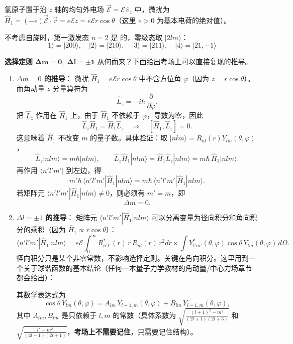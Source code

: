 \begin{modelbox}
氢原子置于沿 $z$ 轴的均匀外电场 $\vec{\mathcal{E}} = \mathcal{E}\,\hat{e}_z$ 中，微扰为 $\hat{H}_1 = (-e)\vec{\mathcal{E}}\cdot\vec{r} = e\mathcal{E} z = e\mathcal{E} r \cos\theta$（这里 $e>0$ 为基本电荷的绝对值）。

不考虑自旋时，第一激发态 $n=2$ 是 的，零级态取 $|2lm\rangle$：
\[
|1\rangle = |200\rangle, \quad |2\rangle = |210\rangle, \quad |3\rangle = |211\rangle, \quad |4\rangle = |21,-1\rangle
\]

\textbf{选择定则} $\mathbf{\Delta m = 0,\; \Delta l = \pm 1}$ 从何而来？下面给出考场上可以直接复现的推导。

\begin{enumerate}[nosep]
    \item \textbf{$\Delta m = 0$ 的推导}：
    微扰 $\hat{H}_1 = e\mathcal{E} r \cos\theta$ 中不含方位角 $\varphi$（因为 $z = r\cos\theta$）。而角动量 $z$ 分量算符为
    \[
    \hat{L}_z = -i\hbar \, \frac{\partial}{\partial\varphi}.
    \]
    把 $\hat{L}_z$ 作用在 $\hat{H}_1$ 上，由于 $\hat{H}_1$ 不依赖于 $\varphi$，导数为零，因此
    \[
    \hat{L}_z \hat{H}_1 = \hat{H}_1 \hat{L}_z \quad\Longrightarrow\quad [\hat{H}_1, \hat{L}_z] = 0.
    \]
    这意味着 $\hat{H}_1$ 不改变 $m$ 的量子数。具体验证：取 $|nlm\rangle = R_{nl}(r) Y_{lm}(\theta,\varphi)$，
    \[
    \hat{L}_z |nlm\rangle = m\hbar |nlm\rangle, \qquad \hat{L}_z \hat{H}_1 |nlm\rangle = \hat{H}_1 \hat{L}_z |nlm\rangle = m\hbar \, \hat{H}_1 |nlm\rangle.
    \]
    再作用 $\langle n'l'm'|$ 到左边，得
    \[
    m' \hbar \, \langle n'l'm'|\hat{H}_1|nlm\rangle = m \hbar \, \langle n'l'm'|\hat{H}_1|nlm\rangle.
    \]
    若矩阵元 $\langle n'l'm'|\hat{H}_1|nlm\rangle \neq 0$，则必须有 $m' = m$，即
    \[
    \boxed{\Delta m = 0}.
    \]

    \item \textbf{$\Delta l = \pm 1$ 的推导}：
    矩阵元 $\langle n'l'm'|\hat{H}_1|nlm\rangle$ 可以分离变量为径向积分和角向积分的乘积（因为 $\hat{H}_1 \propto r\cos\theta$）：
    \[
    \langle n'l'm'|\hat{H}_1|nlm\rangle = e\mathcal{E} \int_0^\infty R_{n'l'}^*(r) \, r \, R_{nl}(r) \, r^2 dr \times \int Y_{l'm'}^*(\theta,\varphi) \cos\theta \, Y_{lm}(\theta,\varphi) \, d\Omega.
    \]
    径向积分只是某个非零常数，不影响选择定则。关键在角向积分。这里用到一个关于球谐函数的基本结论（任何一本量子力学教材的角动量/中心力场章节都会给出）：
    \begin{center}
    \end{center}
    其数学表达式为
    \[
    \cos\theta \, Y_{lm}(\theta,\varphi) = A_{lm} \, Y_{l+1,m}(\theta,\varphi) + B_{lm} \, Y_{l-1,m}(\theta,\varphi),
    \]
    其中 $A_{lm}, B_{lm}$ 是只依赖于 $l,m$ 的常数（具体系数为 $\sqrt{\frac{(l+1)^2-m^2}{(2l+1)(2l+3)}}$ 和 $\sqrt{\frac{l^2-m^2}{(2l-1)(2l+1)}}$，\textbf{考场上不需要记住}，只需要记住结构）。


\end{enumerate}
\end{modelbox}
